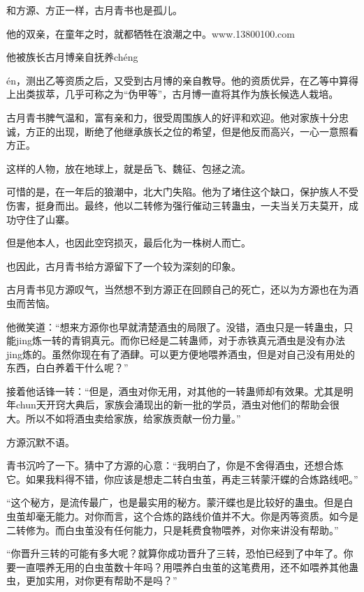 
\begin{this_body}

和方源、方正一样，古月青书也是孤儿。

他的双亲，在童年之时，就都牺牲在浪潮之中。www.13800100.com

他被族长古月博亲自抚养chéng

én，测出乙等资质之后，又受到古月博的亲自教导。他的资质优异，在乙等中算得上出类拔萃，几乎可称之为“伪甲等”，古月博一直将其作为族长候选人栽培。

古月青书脾气温和，富有亲和力，很受周围族人的好评和欢迎。他对家族十分忠诚，方正的出现，断绝了他继承族长之位的希望，但是他反而高兴，一心一意照看方正。

这样的人物，放在地球上，就是岳飞、魏征、包拯之流。

可惜的是，在一年后的狼潮中，北大门失陷。他为了堵住这个缺口，保护族人不受伤害，挺身而出。最终，他以二转修为强行催动三转蛊虫，一夫当关万夫莫开，成功守住了山寨。

但是他本人，也因此空窍损灭，最后化为一株树人而亡。

也因此，古月青书给方源留下了一个较为深刻的印象。

古月青书见方源叹气，当然想不到方源正在回顾自己的死亡，还以为方源也在为酒虫而苦恼。

他微笑道：“想来方源你也早就清楚酒虫的局限了。没错，酒虫只是一转蛊虫，只能jing炼一转的青铜真元。而你已经是二转蛊师，对于赤铁真元酒虫是没有办法jing炼的。虽然你现在有了酒肆。可以更方便地喂养酒虫，但是对自己没有用处的东西，白白养着干什么呢？”

接着他话锋一转：“但是，酒虫对你无用，对其他的一转蛊师却有效果。尤其是明年chun天开窍大典后，家族会涌现出的新一批的学员，酒虫对他们的帮助会很大。所以不如将酒虫卖给家族，给家族贡献一份力量。”

方源沉默不语。

青书沉吟了一下。猜中了方源的心意：“我明白了，你是不舍得酒虫，还想合炼它。如果我料得不错，你应该是想走二转白虫茧，再走三转蒙汗蝶的合炼路线吧。”

“这个秘方，是流传最广，也是最实用的秘方。蒙汗蝶也是比较好的蛊虫。但是白虫茧却毫无能力。对你而言，这个合炼的路线价值并不大。你是丙等资质。如今是二转修为。而白虫茧没有任何能力，只是耗费食物喂养，对你来讲没有帮助。”

“你晋升三转的可能有多大呢？就算你成功晋升了三转，恐怕已经到了中年了。你要一直喂养无用的白虫茧数十年吗？用喂养白虫茧的这笔费用，还不如喂养其他蛊虫，更加实用，对你更有帮助不是吗？”


\end{this_body}
